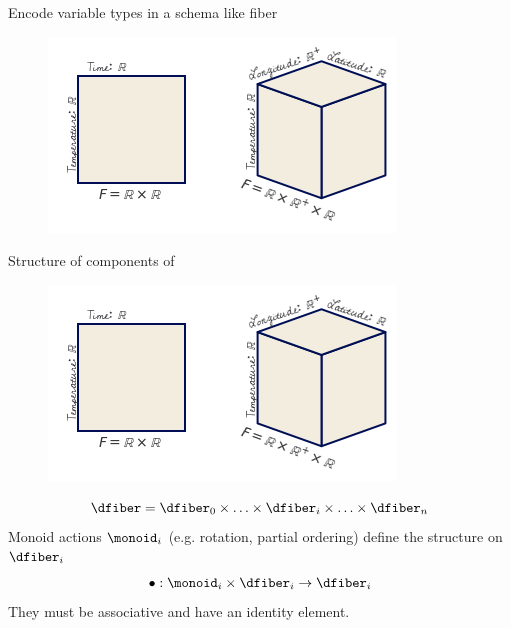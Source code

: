 \documentclass[xcolor={dvipsnames}, handout]{beamer}
\begin{document}
\begin{frame}{Encode variable types in a schema like fiber \cite{spivakDatabasesAreCategories2010,spivakSIMPLICIALDATABASES}}
    \begin{figure}[H]
        \centering
        \includegraphics[width=\textwidth]{figures/math/fiber.png}
    \label{fig:data_fiber_example}
    \end{figure}
\end{frame}

\begin{frame}{Structure of components of \dfiber}
    \begin{figure}[H]
        \centering
        \includegraphics[height=.3\textheight]{figures/math/fiber.png}
    \label{fig:data_fiber_example}
    \end{figure}
        \begin{equation*}
            \dfiber = \dfiber_0 \times \ldots \times \dfiber_i \times \ldots \times \dfiber_n
        \end{equation*}
        \pause
        Monoid actions $\monoid_{i}$ (e.g. rotation, partial ordering) define the structure on $\dfiber_i$
        \begin{equation*}
            \bullet: \monoid_i\times \dfiber_i \rightarrow \dfiber_i
        \end{equation*}
        They must be associative and have an identity element. 
\end{frame}
\end{document}

